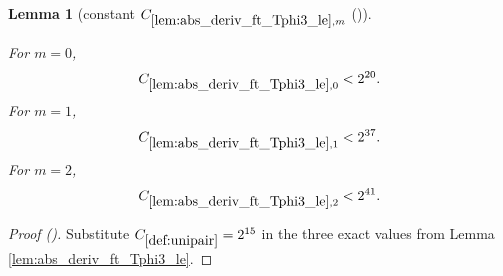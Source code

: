\documentclass[12pt,reqno]{amsart}
\newcommand{\auto}{{({\tiny\faCar})}}
\theoremstyle{plain}
\newtheorem{lemma}[theorem]{Lemma}
\numberwithin{equation}{section}
\theoremstyle{remark}
\newcommand{\uses}[1]{}
\newcommand{\usesdefs}[1]{}
\newcommand{\leanok}{}
\newcommand{\lean}[1]{}
\begin{document}
\begin{lemma}[constant $C_{\ref{lem:abs_deriv_ft_Tphi3_le},m}$ \auto]\label{constant T phi three derivative}\uses{lem:abs_deriv_ft_Tphi3_le}\usesdefs{def:unipair}
\lean{Auto.constantTPhiThreeDerivative}
\leanok
For $m=0$,
\begin{equation}\label{constant T phi three derivative bound}
C_{\ref{lem:abs_deriv_ft_Tphi3_le},0}<2^{20}.
\end{equation}
For $m=1$,
\begin{equation}\label{auto:constant-T-phi-three-derivative-one}
C_{\ref{lem:abs_deriv_ft_Tphi3_le},1}<2^{37}.
\end{equation}
For $m=2$,
\begin{equation}\label{auto:constant-T-phi-three-derivative-two}
C_{\ref{lem:abs_deriv_ft_Tphi3_le},2}<2^{41}.
\end{equation}
\end{lemma}
\begin{proof}[Proof \auto]
Substitute $C_{\ref{def:unipair}}=2^{15}$ in the three exact values from Lemma \ref{lem:abs_deriv_ft_Tphi3_le}.
\end{proof}
\end{document}
